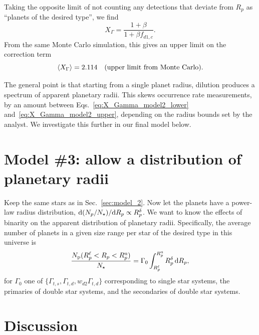 \documentclass{emulateapj}
\begin{document}
Taking the opposite limit of not counting any detections that deviate 
from $R_p$ as ``planets of the desired type'',
we find
\begin{equation}
X_{\Gamma} = \frac{1 + \beta }{1 + \beta f_{d1,c}}.
\end{equation}
From the same Monte Carlo simulation, this gives an upper limit on the 
correction term
\begin{equation}
\langle X_\Gamma \rangle = 2.114\quad ({\rm upper\ limit\ from\ Monte\ 
Carlo}).
\label{eq:X_Gamma_model2_upper}
\end{equation}

The general point is that starting from a single planet radius, dilution 
produces a spectrum of apparent planetary radii. 
This skews occurrence rate measurements, by an amount between 
Eqs.~\ref{eq:X_Gamma_model2_lower} and~\ref{eq:X_Gamma_model2_upper},
depending on the radius bounds set by the analyst.
We investigate this further in our final model below.


\section{Model \#3: allow a distribution of planetary radii}
\label{sec:model_3}

Keep the same stars as in Sec.~\ref{sec:model_2}.
Now let the planets have a power-law radius distribution, ${\rm 
d}(N_p/N_\star)/{\rm 
d}R_p\propto R_p^\delta$. 
We want to know the effects of binarity on the apparent distribution of 
planetary radii.
Specifically, the average number of planets in a given size range per star of 
the desired type in this universe is
\begin{equation}
\frac{N_{\rm p}(R_p^{\rm \ell}<R_p <R_p^{\rm u})}{N_{\rm \star}} = 
\Gamma_0 \int_{R_p^{\rm \ell}}^{R_p^{\rm u}} R_p^\delta \,{\rm d}R_p,
\end{equation}
for $\Gamma_0$ one of $\{\Gamma_{t,s}, \Gamma_{t,d}, w_{d2}\Gamma_{t,d}\}$
corresponding to single star systems, the primaries of double star systems, 
and the secondaries of double star systems.




\section{Discussion}
\label{sec:discussion}
\end{document}
